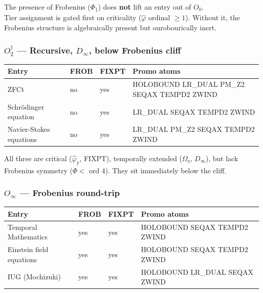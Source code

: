 \documentclass[12pt,a4paper]{article}
\begin{document}
The presence of Frobenius ($\Phi_{\}}$) does \textbf{not} lift an entry out of $O_0$. \\
Tier assignment is gated first on criticality ($\hat{\varphi}$ ordinal $\geq 1$). Without it, the Frobenius structure is algebraically present but ourobourically inert.

\subsubsection*{$O_2^\dagger$ --- Recursive, $D_\infty$, below Frobenius cliff}

\begin{table}[htbp]
\centering
\small

\begin{tabularx}{\textwidth}{>{\raggedright\arraybackslash}X >{\centering\arraybackslash}X >{\centering\arraybackslash}X >{\raggedright\arraybackslash}X}
\toprule
\textbf{Entry} & \textbf{FROB} & \textbf{FIXPT} & \textbf{Promo atoms} \\
\midrule

ZFCt & no & yes & HOLOBOUND LR\_DUAL PM\_Z2 SEQAX TEMPD2 ZWIND \\
Schrödinger equation & no & yes & LR\_DUAL SEQAX TEMPD2 ZWIND \\
Navier-Stokes equations & no & yes & LR\_DUAL PM\_Z2 SEQAX TEMPD2 ZWIND \\
\bottomrule
\end{tabularx}
\end{table}

All three are critical ($\hat{\varphi}_{\text{ÿ}}$, FIXPT), temporally extended ($\Omega_{\text{z}}$, $D_\infty$), but lack Frobenius symmetry ($\Phi <$ ord 4). They sit immediately below the cliff.

\subsubsection*{$O_\infty$ --- Frobenius round-trip}

\begin{table}[htbp]
\centering
\small

\begin{tabularx}{\textwidth}{>{\raggedright\arraybackslash}X >{\centering\arraybackslash}X >{\centering\arraybackslash}X >{\raggedright\arraybackslash}X}
\toprule
\textbf{Entry} & \textbf{FROB} & \textbf{FIXPT} & \textbf{Promo atoms} \\
\midrule

Temporal Mathematics & yes & yes & HOLOBOUND SEQAX TEMPD2 ZWIND \\
Einstein field equations & yes & yes & HOLOBOUND SEQAX TEMPD2 ZWIND \\
IUG (Mochizuki) & yes & yes & HOLOBOUND LR\_DUAL SEQAX ZWIND \\
\bottomrule
\end{tabularx}
\end{table}
\end{document}
